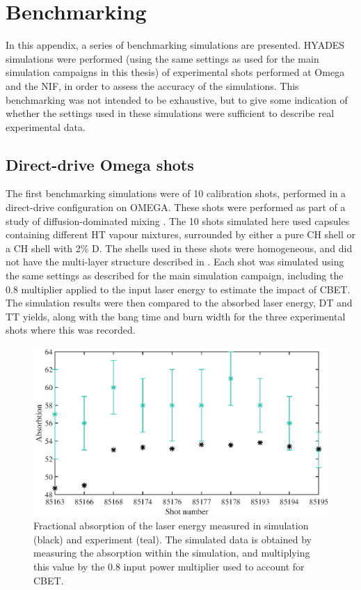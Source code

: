 \chapter{\label{app:benchmark} Benchmarking}

\minitoc

In this appendix, a series of benchmarking simulations are presented. HYADES simulations were performed (using the same settings as used for the main simulation campaigns in this thesis) of experimental shots performed at Omega and the NIF, in order to assess the accuracy of the simulations. This benchmarking was not intended to be exhaustive, but to give some indication of whether the settings used in these simulations were sufficient to describe real experimental data.

\section{Direct-drive Omega shots}

The first benchmarking simulations were of 10 calibration shots, performed in a direct-drive configuration on OMEGA. These shots were performed as part of a study of diffusion-dominated mixing \cite{Zylstra2018a}. The 10 shots simulated here used capsules containing different HT vapour mixtures, surrounded by either a pure CH shell or a CH shell with 2\% D. The shells used in these shots were homogeneous, and did not have the multi-layer structure described in \cite{Zylstra2018a}. Each shot was simulated using the same settings as described for the main simulation campaign, including the 0.8 multiplier applied to the input laser energy to estimate the impact of CBET. The simulation results were then compared to the absorbed laser energy, DT and TT yields, along with the bang time and burn width for the three experimental shots where this was recorded.

\begin{figure}[ht]
\centering
\includegraphics{figures/LowCR/BenchmarkOmegaAbsorbtion.eps}
\caption{Fractional absorption of the laser energy measured in simulation (black) and experiment (teal). The simulated data is obtained by measuring the absorption within the simulation, and multiplying this value by the 0.8 input power multiplier used to account for CBET.}
\label{fig:OmegaAbs}
\end{figure}

